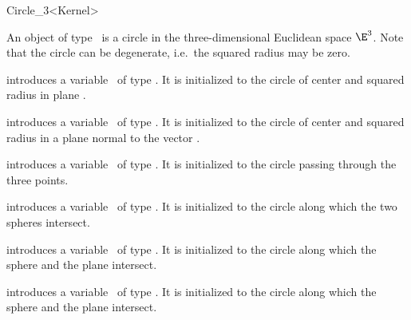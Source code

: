 \begin{ccRefClass}{Circle_3<Kernel>}

\ccDefinition

An object of type \ccRefName\ is a circle in the
three-dimensional Euclidean space $\E^3$. Note that the
circle can be degenerate, i.e.\ the squared radius may be zero.

\ccCreation
{}

\ccHidden
{}

	{introduces a variable \ccVar\ of type \ccClassTemplateName.
        It is initialized to the circle of center  and 
	squared radius  in plane .
	}

	{introduces a variable \ccVar\ of type \ccClassTemplateName.
        It is initialized to the circle of center  and 
	squared radius  in a plane normal to
	the vector .
	}

	{introduces a variable \ccVar\ of type \ccClassTemplateName.
        It is initialized to the circle passing through the three points.
        }

	{introduces a variable \ccVar\ of type \ccClassTemplateName.
        It is initialized to the circle along which the two spheres intersect.
	}

	{introduces a variable \ccVar\ of type \ccClassTemplateName.
        It is initialized to the circle along which the sphere and the 
	plane intersect.
	}

	{introduces a variable \ccVar\ of type \ccClassTemplateName.
        It is initialized to the circle along which the sphere and the 
	plane intersect.
	}


\end{ccRefClass}
